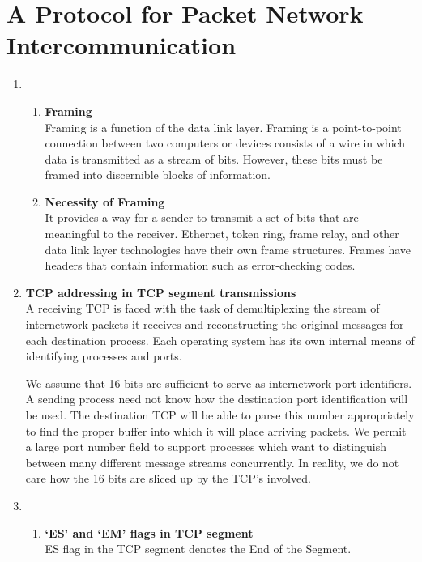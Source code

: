 \documentclass[12pt]{article}
\begin{document}
\section{A Protocol for Packet Network Intercommunication}
\begin{enumerate}
    \item 
    \begin{enumerate}[label=(\alph*)] %
        \item \textbf{Framing} \\
        Framing is a function of the data link layer. Framing is a point-to-point connection between two computers or devices consists of a wire in which data is transmitted as a stream of bits. However, these bits must be framed into discernible blocks of information.
        
        \item \textbf{Necessity of Framing} \\
        It provides a way for a sender to transmit a set of bits that are meaningful to the receiver. Ethernet, token ring, frame relay, and other data link layer technologies have their own frame structures. Frames have headers that contain information such as error-checking codes.
    \end{enumerate} %

\item \textbf{TCP addressing in TCP segment transmissions} \\
A receiving TCP is faced with the task of demultiplexing the stream of internetwork packets it receives and reconstructing the original messages
for each destination process. Each operating system has its own internal means of identifying processes and ports. 

We assume that 16 bits are sufficient to serve as internetwork port identifiers. A sending process need not know how the destination port identification will be used. The destination TCP will be able to parse this number appropriately to find the proper buffer into which it will place arriving packets. We permit a large port number field to support processes which want to distinguish between many different message streams concurrently. In reality, we do not care how the 16 bits are sliced up by the TCP’s involved.

\item
\begin{enumerate}[label=(\alph*)] %
    \item \textbf{‘ES’ and ‘EM’ flags in TCP segment} \\
    ES flag in the TCP segment denotes the End of the Segment.
    

\end{enumerate}
\end{enumerate}
\end{document}
